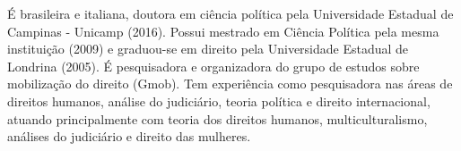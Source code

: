 
\begin{cvparagraph}

É brasileira e italiana, doutora em ciência política pela Universidade Estadual de Campinas - Unicamp (2016). Possui mestrado em Ciência Política pela mesma instituição (2009) e graduou-se em direito pela Universidade Estadual de Londrina (2005). É pesquisadora e organizadora do grupo de estudos sobre mobilização do direito (Gmob). Tem experiência como pesquisadora nas áreas de direitos humanos, análise do judiciário, teoria política e direito internacional, atuando principalmente com teoria dos direitos humanos, multiculturalismo,  análises do judiciário e direito das mulheres.

\end{cvparagraph}
